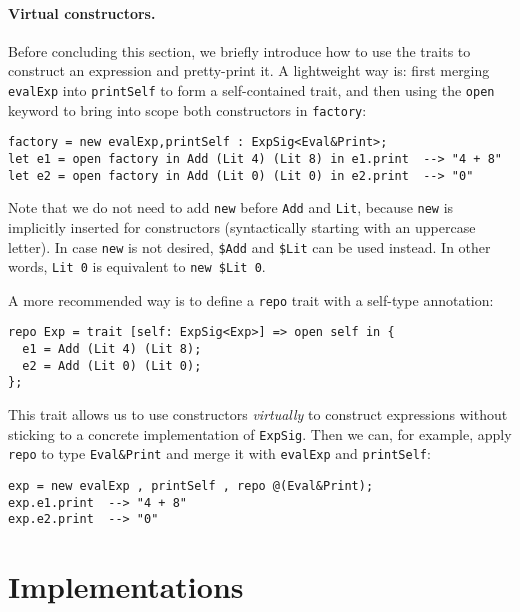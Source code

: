 \paragraph{Virtual constructors.}
Before concluding this section, we briefly introduce how to use the traits to
construct an expression and pretty-print it. A lightweight way is: first merging
\lstinline{evalExp} into \lstinline{printSelf} to form a self-contained trait,
and then using the \lstinline{open} keyword to bring into scope both
constructors in \lstinline{factory}:
\begin{lstlisting}
factory = new evalExp,printSelf : ExpSig<Eval&Print>;
let e1 = open factory in Add (Lit 4) (Lit 8) in e1.print  --> "4 + 8"
let e2 = open factory in Add (Lit 0) (Lit 0) in e2.print  --> "0"
\end{lstlisting}
Note that we do not need to add \lstinline{new} before \lstinline{Add} and
\lstinline{Lit}, because \lstinline{new} is implicitly inserted for constructors
(syntactically starting with an uppercase letter). In case \lstinline{new} is
not desired, \lstinline{$Add} and \lstinline{$Lit} can be used instead. In other
words, \lstinline{Lit 0} is equivalent to \lstinline{new $Lit 0}.

A more recommended way is to define a \lstinline{repo} trait with a self-type
annotation:
\begin{lstlisting}
repo Exp = trait [self: ExpSig<Exp>] => open self in {
  e1 = Add (Lit 4) (Lit 8);
  e2 = Add (Lit 0) (Lit 0);
};
\end{lstlisting}
This trait allows us to use constructors \emph{virtually} to construct
expressions without sticking to a concrete implementation of \lstinline{ExpSig}.
Then we can, for example, apply \lstinline{repo} to type \lstinline{Eval&Print}
and merge it with \lstinline{evalExp} and \lstinline{printSelf}:
\begin{lstlisting}
exp = new evalExp , printSelf , repo @(Eval&Print);
exp.e1.print  --> "4 + 8"
exp.e2.print  --> "0"
\end{lstlisting}

\section{Implementations}

